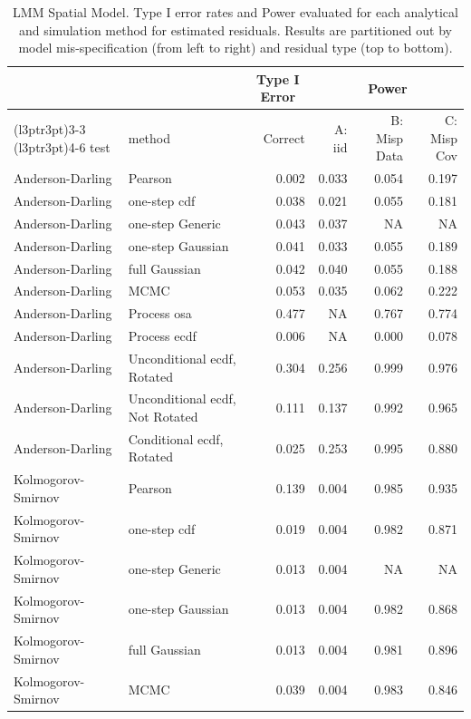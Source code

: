 \documentclass[
]{article}
\begin{document}
\begin{table}[H]
\centering
\caption{\label{tab:spatial-results-lmm-est}LMM Spatial Model. Type I error rates and Power evaluated for each analytical and simulation method for estimated residuals. Results are partitioned out by model mis-specification (from left to right) and residual type (top to bottom).}
\centering
\begin{tabular}[t]{llrrrr}
\toprule
\multicolumn{1}{c}{ } & \multicolumn{1}{c}{ } & \multicolumn{1}{c}{Type I Error} & \multicolumn{3}{c}{Power} \\
\cmidrule(l{3pt}r{3pt}){3-3} \cmidrule(l{3pt}r{3pt}){4-6}
test & method & Correct & A: iid & B: Misp Data & C: Misp Cov\\
\midrule
Anderson-Darling & Pearson & 0.002 & 0.033 & 0.054 & 0.197\\
Anderson-Darling & one-step cdf & 0.038 & 0.021 & 0.055 & 0.181\\
Anderson-Darling & one-step Generic & 0.043 & 0.037 & NA & NA\\
Anderson-Darling & one-step Gaussian & 0.041 & 0.033 & 0.055 & 0.189\\
Anderson-Darling & full Gaussian & 0.042 & 0.040 & 0.055 & 0.188\\
\addlinespace
Anderson-Darling & MCMC & 0.053 & 0.035 & 0.062 & 0.222\\
Anderson-Darling & Process osa & 0.477 & NA & 0.767 & 0.774\\
Anderson-Darling & Process ecdf & 0.006 & NA & 0.000 & 0.078\\
Anderson-Darling & Unconditional ecdf, Rotated & 0.304 & 0.256 & 0.999 & 0.976\\
Anderson-Darling & Unconditional ecdf, Not Rotated & 0.111 & 0.137 & 0.992 & 0.965\\
\addlinespace
Anderson-Darling & Conditional ecdf, Rotated & 0.025 & 0.253 & 0.995 & 0.880\\
Kolmogorov- Smirnov & Pearson & 0.139 & 0.004 & 0.985 & 0.935\\
Kolmogorov- Smirnov & one-step cdf & 0.019 & 0.004 & 0.982 & 0.871\\
Kolmogorov- Smirnov & one-step Generic & 0.013 & 0.004 & NA & NA\\
Kolmogorov- Smirnov & one-step Gaussian & 0.013 & 0.004 & 0.982 & 0.868\\
\addlinespace
Kolmogorov- Smirnov & full Gaussian & 0.013 & 0.004 & 0.981 & 0.896\\
Kolmogorov- Smirnov & MCMC & 0.039 & 0.004 & 0.983 & 0.846\\

\end{tabular}
\end{table}
\end{document}
